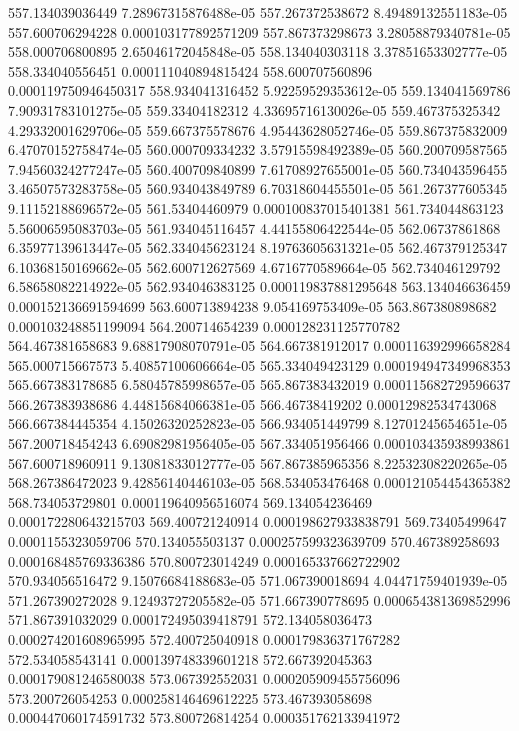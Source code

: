 {557.134039036449 7.28967315876488e-05
557.267372538672 8.49489132551183e-05
557.600706294228 0.000103177892571209
557.867373298673 3.28058879340781e-05
558.000706800895 2.65046172045848e-05
558.134040303118 3.37851653302777e-05
558.334040556451 0.000111040894815424
558.600707560896 0.000119750946450317
558.934041316452 5.92259529353612e-05
559.134041569786 7.90931783101275e-05
559.33404182312 4.33695716130026e-05
559.467375325342 4.29332001629706e-05
559.667375578676 4.95443628052746e-05
559.867375832009 6.47070152758474e-05
560.000709334232 3.57915598492389e-05
560.200709587565 7.94560324277247e-05
560.400709840899 7.61708927655001e-05
560.734043596455 3.46507573283758e-05
560.934043849789 6.70318604455501e-05
561.267377605345 9.11152188696572e-05
561.53404460979 0.000100837015401381
561.734044863123 5.56006595083703e-05
561.934045116457 4.44155806422544e-05
562.06737861868 6.35977139613447e-05
562.334045623124 8.19763605631321e-05
562.467379125347 6.10368150169662e-05
562.600712627569 4.6716770589664e-05
562.734046129792 6.58658082214922e-05
562.934046383125 0.000119837881295648
563.134046636459 0.000152136691594699
563.600713894238 9.054169753409e-05
563.867380898682 0.000103248851199094
564.200714654239 0.000128231125770782
564.467381658683 9.68817908070791e-05
564.667381912017 0.000116392996658284
565.000715667573 5.40857100606664e-05
565.334049423129 0.000194947349968353
565.667383178685 6.58045785998657e-05
565.867383432019 0.000115682729596637
566.267383938686 4.44815684066381e-05
566.46738419202 0.00012982534743068
566.667384445354 4.15026320252823e-05
566.934051449799 8.12701245654651e-05
567.200718454243 6.69082981956405e-05
567.334051956466 0.000103435938993861
567.600718960911 9.13081833012777e-05
567.867385965356 8.22532308220265e-05
568.267386472023 9.42856140446103e-05
568.534053476468 0.000121054454365382
568.734053729801 0.000119640956516074
569.134054236469 0.000172280643215703
569.400721240914 0.000198627933838791
569.73405499647 0.0001155323059706
570.134055503137 0.000257599323639709
570.467389258693 0.000168485769336386
570.800723014249 0.000165337662722902
570.934056516472 9.15076684188683e-05
571.067390018694 4.04471759401939e-05
571.267390272028 9.12493727205582e-05
571.667390778695 0.000654381369852996
571.867391032029 0.000172495039418791
572.134058036473 0.000274201608965995
572.400725040918 0.000179836371767282
572.534058543141 0.000139748339601218
572.667392045363 0.000179081246580038
573.067392552031 0.000205909455756096
573.200726054253 0.000258146469612225
573.467393058698 0.000447060174591732
573.800726814254 0.000351762133941972
}
